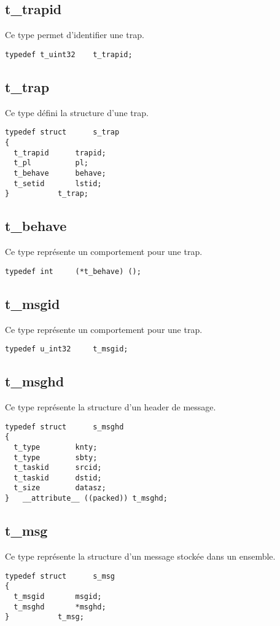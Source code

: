 \documentclass[10pt,a4wide]{article}
\begin{document}
\subsection{t\_trapid}
Ce type permet d'identifier une trap.
\begin{verbatim}
typedef t_uint32	t_trapid;
\end{verbatim}

\subsection{t\_trap}
Ce type d\'efini la structure d'une trap.
\begin{verbatim}
typedef struct		s_trap
{
  t_trapid		trapid;
  t_pl			pl;
  t_behave		behave;
  t_setid		lstid;
}			t_trap;
\end{verbatim}

\subsection{t\_behave}
Ce type repr\'esente un comportement pour une trap.
\begin{verbatim}
typedef int		(*t_behave) ();
\end{verbatim}

\subsection{t\_msgid}
Ce type repr\'esente un comportement pour une trap.
\begin{verbatim}
typedef u_int32		t_msgid;
\end{verbatim}

\subsection{t\_msghd}
Ce type repr\'esente la structure d'un header de message.
\begin{verbatim}
typedef struct		s_msghd
{
  t_type		knty;
  t_type		sbty;
  t_taskid		srcid;
  t_taskid		dstid;
  t_size		datasz;
}	__attribute__ ((packed)) t_msghd;
\end{verbatim}

\subsection{t\_msg}
Ce type repr\'esente la structure d'un message stock\'ee dans un ensemble.
\begin{verbatim}
typedef struct		s_msg
{
  t_msgid		msgid;
  t_msghd		*msghd;
}			t_msg;
\end{verbatim}
\end{document}
